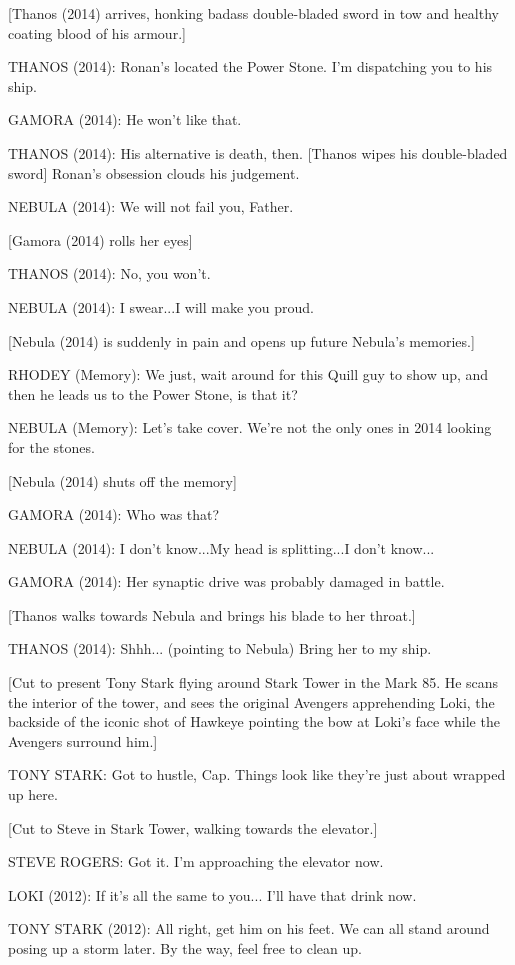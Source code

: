 [Thanos (2014) arrives, honking badass double-bladed sword in tow and healthy coating blood of his armour.]

THANOS (2014): Ronan's located the Power Stone. I'm dispatching you to his ship.

GAMORA (2014): He won't like that.

THANOS (2014): His alternative is death, then. [Thanos wipes his double-bladed sword] Ronan's obsession clouds his judgement.

NEBULA (2014): We will not fail you, Father.

[Gamora (2014) rolls her eyes]

THANOS (2014): No, you won't.

NEBULA (2014): I swear...I will make you proud.

[Nebula (2014) is suddenly in pain and opens up future Nebula's memories.]

RHODEY (Memory): We just, wait around for this Quill guy to show up, and then he leads us to the Power Stone, is that it?

NEBULA (Memory): Let's take cover. We're not the only ones in 2014 looking for the stones.

[Nebula (2014) shuts off the memory]

GAMORA (2014): Who was that?

NEBULA (2014): I don't know...My head is splitting...I don't know...

GAMORA (2014): Her synaptic drive was probably damaged in battle.

[Thanos walks towards Nebula and brings his blade to her throat.]

THANOS (2014): Shhh... (pointing to Nebula) Bring her to my ship.

[Cut to present Tony Stark flying around Stark Tower in the Mark 85. He scans the interior of the tower, and sees the original Avengers apprehending Loki, the backside of the iconic shot of Hawkeye pointing the bow at Loki's face while the Avengers surround him.]

TONY STARK: Got to hustle, Cap. Things look like they're just about wrapped up here.

[Cut to Steve in Stark Tower, walking towards the elevator.]

STEVE ROGERS: Got it. I'm approaching the elevator now.

LOKI (2012): If it's all the same to you... I'll have that drink now.

TONY STARK (2012): All right, get him on his feet. We can all stand around posing up a storm later. By the way, feel free to clean up.

